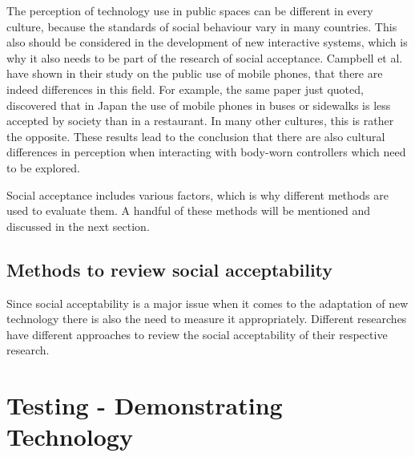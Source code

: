 \documentclass{sigchi}
\begin{document}
The perception of technology use in public spaces can be different in every culture, because the standards of social behaviour vary in many countries. This also should be considered in the development of new interactive systems, which is why it also needs to be part of the research of social acceptance. Campbell et al. \cite{mobile-phones} have shown in their study on the public use of mobile phones, that there are indeed differences in this field. For example, the same paper just quoted, discovered that in Japan the use of mobile phones in buses or sidewalks is less accepted by society than in a restaurant. In many other cultures, this is rather the opposite. \cite{mobile-phones} These results lead to the conclusion that there are also cultural differences in perception when interacting with body-worn controllers which need to be explored.

Social acceptance includes various factors, which is why different methods are used to evaluate them. A handful of these methods will be mentioned and discussed in the next section.

\subsection{Methods to review social acceptability}
%

Since social acceptability is a major issue when it comes to the adaptation of new technology there is also the need to measure it appropriately. Different researches have different approaches to review the social acceptability of their respective research. \cite{touch-wrist}

\section{Testing - Demonstrating Technology}
\end{document}
